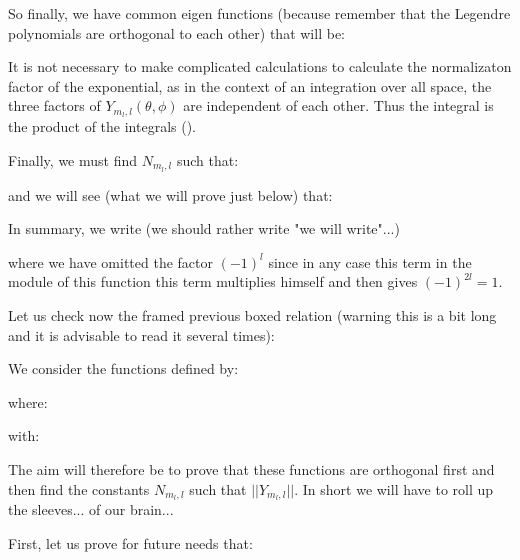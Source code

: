 	So finally, we have common eigen functions (because remember that the Legendre polynomials are orthogonal to each other) that will be:
	 
	\begin{tcolorbox}[title=Remark,colframe=black,arc=10pt]
	It is not necessary to make complicated calculations to calculate the normalizaton factor of the exponential, as in the context of an integration over all space, the three factors of $Y_{m_l,l}(\theta,\phi)$ are independent of each other. Thus the integral is the product of the integrals ().
	\end{tcolorbox}
	Finally, we must find $N_{m_l,l}$ such that:
	
	and we will see (what we will prove just below) that:
	
	In summary, we write (we should rather write "we will write"...)
	
	where we have omitted the factor $(-1)^l$ since in any case this term in the module of this function this term multiplies himself and then gives $(-1)^{2l}=1$.

Let us check now the framed previous boxed relation (warning this is a bit long and it is advisable to read it several times):

	We consider the functions defined by:
	
	where:
	
	with:
	
	The aim will therefore be to prove that these functions are orthogonal first and then find the constants $N_{m_l,l}$ such that $||Y_{m_l,l}||$. In short we will have to roll up the sleeves... of our brain...

	First, let us prove for future needs that:
	
